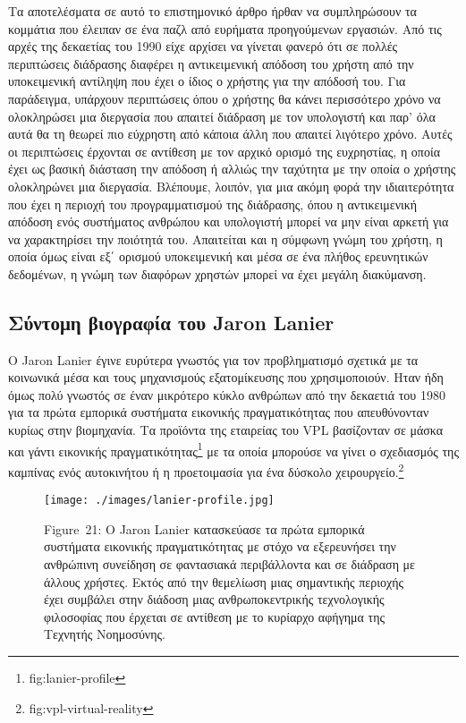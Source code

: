 \documentclass[
]{article}
\begin{document}
Τα αποτελέσματα σε αυτό το επιστημονικό άρθρο ήρθαν να συμπληρώσουν τα
κομμάτια που έλειπαν σε ένα παζλ από ευρήματα προηγούμενων εργασιών. Από
τις αρχές της δεκαετίας του 1990 είχε αρχίσει να γίνεται φανερό ότι σε
πολλές περιπτώσεις διάδρασης διαφέρει η αντικειμενική απόδοση του χρήστη
από την υποκειμενική αντίληψη που έχει ο ίδιος ο χρήστης για την απόδοσή
του. Για παράδειγμα, υπάρχουν περιπτώσεις όπου ο χρήστης θα κάνει
περισσότερο χρόνο να ολοκληρώσει μια διεργασία που απαιτεί διάδραση με
τον υπολογιστή και παρ' όλα αυτά θα τη θεωρεί πιο εύχρηστη από κάποια
άλλη που απαιτεί λιγότερο χρόνο. Αυτές οι περιπτώσεις έρχονται σε
αντίθεση με τον αρχικό ορισμό της ευχρηστίας, η οποία έχει ως βασική
διάσταση την απόδοση ή αλλιώς την ταχύτητα με την οποία ο χρήστης
ολοκληρώνει μια διεργασία. Βλέπουμε, λοιπόν, για μια ακόμη φορά την
ιδιαιτερότητα που έχει η περιοχή του προγραμματισμού της διάδρασης, όπου
η αντικειμενική απόδοση ενός συστήματος ανθρώπου και υπολογιστή μπορεί
να μην είναι αρκετή για να χαρακτηρίσει την ποιότητά του. Απαιτείται και
η σύμφωνη γνώμη του χρήστη, η οποία όμως είναι εξ΄ ορισμού υποκειμενική
και μέσα σε ένα πλήθος ερευνητικών δεδομένων, η γνώμη των διαφόρων
χρηστών μπορεί να έχει μεγάλη διακύμανση.

\hypertarget{ux3c3ux3cdux3bdux3c4ux3bfux3bcux3b7-ux3b2ux3b9ux3bfux3b3ux3c1ux3b1ux3c6ux3afux3b1-ux3c4ux3bfux3c5-jaron-lanier}{%
\subsection{Σύντομη βιογραφία του Jaron
Lanier}\label{ux3c3ux3cdux3bdux3c4ux3bfux3bcux3b7-ux3b2ux3b9ux3bfux3b3ux3c1ux3b1ux3c6ux3afux3b1-ux3c4ux3bfux3c5-jaron-lanier}}

Ο Jaron Lanier έγινε ευρύτερα γνωστός για τον προβληματισμό σχετικά με
τα κοινωνικά μέσα και τους μηχανισμούς εξατομίκευσης που χρησιμοποιούν.
Ηταν ήδη όμως πολύ γνωστός σε έναν μικρότερο κύκλο ανθρώπων από την
δεκαετιά του 1980 για τα πρώτα εμπορικά συστήματα εικονικής
πραγματικότητας που απευθύνονταν κυρίως στην βιομηχανία. Τα προϊόντα της
εταιρείας του VPL βασίζονταν σε μάσκα και γάντι εικονικής
πραγματικότητας\footnote{fig:lanier-profile} με τα οποία μπορούσε να
γίνει ο σχεδιασμός της καμπίνας ενός αυτοκινήτου ή η προετοιμασία για
ένα δύσκολο χειρουργείο.\footnote{fig:vpl-virtual-reality}

\leavevmode{}%
\begin{figure}
\hypertarget{fig:lanier-profile}{%
\centering
\texttt{[image: ./images/lanier-profile.jpg]}
\caption{Figure~21: Ο Jaron Lanier κατασκεύασε τα πρώτα εμπορικά
συστήματα εικονικής πραγματικότητας με στόχο να εξερευνήσει την
ανθρώπινη συνείδηση σε φαντασιακά περιβάλλοντα και σε διάδραση με άλλους
χρήστες. Εκτός από την θεμελίωση μιας σημαντικής περιοχής έχει συμβάλει
στην διάδοση μιας ανθρωποκεντρικής τεχνολογικής φιλοσοφίας που έρχεται
σε αντίθεση με το κυρίαρχο αφήγημα της Τεχνητής
Νοημοσύνης.}\label{fig:lanier-profile}
}
\end{figure}
\end{document}
